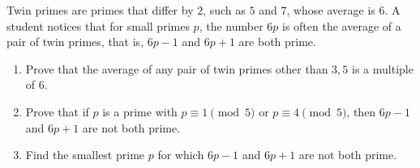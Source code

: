 Twin primes are primes that differ by $2$, such as $5$ and $7$, whose average is $6$. A student notices that for small primes $p$, the number $6p$ is often the average of a pair of twin primes, that is, $6p-1$ and $6p+1$ are both prime.
\begin{enumerate}
\item[(a)] Prove that the average of any pair of twin primes other than $3,5$ is a multiple of $6$.
\item[(b)] Prove that if $p$ is a prime with $p\equiv1\pmod5$ or $p\equiv4\pmod5$, then $6p-1$ and $6p+1$ are not both prime.
\item[(c)] Find the smallest prime $p$ for which $6p-1$ and $6p+1$ are not both prime.
\end{enumerate}
